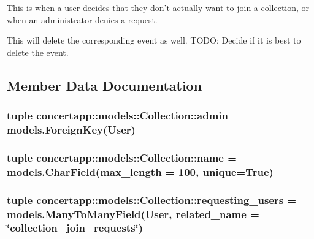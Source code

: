 This is when a user decides that they don't actually want to join a collection, or when an administrator denies a request. 

This will delete the corresponding event as well. TODO: Decide if it is best to delete the event. 

\subsection{Member Data Documentation}
\hypertarget{classconcertapp_1_1models_1_1_collection_a72a91bd0d880ea84f678d0544c7350be}{
\subsubsection[{admin}]{\setlength{\rightskip}{0pt plus 5cm}tuple {\bf concertapp::models::Collection::admin} = models.ForeignKey(User)}}
\label{classconcertapp_1_1models_1_1_collection_a72a91bd0d880ea84f678d0544c7350be}
\hypertarget{classconcertapp_1_1models_1_1_collection_a392d7a6c719983f7e96a36ebc5b0b696}{
\subsubsection[{name}]{\setlength{\rightskip}{0pt plus 5cm}tuple {\bf concertapp::models::Collection::name} = models.CharField(max\_\-length = 100, unique=True)}}
\label{classconcertapp_1_1models_1_1_collection_a392d7a6c719983f7e96a36ebc5b0b696}
\hypertarget{classconcertapp_1_1models_1_1_collection_a9753ffd883189e01f654151773b2789d}{
\subsubsection[{requesting\_\-users}]{\setlength{\rightskip}{0pt plus 5cm}tuple {\bf concertapp::models::Collection::requesting\_\-users} = models.ManyToManyField(User, related\_\-name = \char`\"{}collection\_\-join\_\-requests\char`\"{})}}
